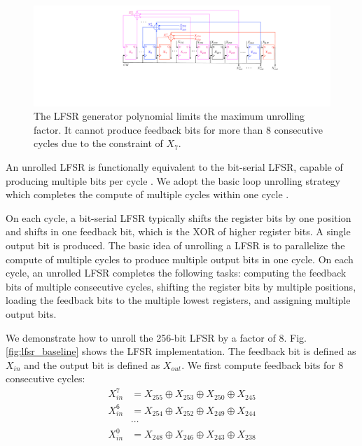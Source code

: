 \begin{figure}[t!]
\centering
\includegraphics[width = 1.0\linewidth]{./figs/lfsr_unroll_limit_compressed}
\caption{The LFSR generator polynomial limits the maximum unrolling factor. It cannot produce feedback bits for more than $8$ consecutive cycles due to the constraint of $X_{7}$.}
\label{fig:lfsr_unrol_limit}
\end{figure}

An unrolled LFSR is functionally equivalent to the bit-serial LFSR, capable of producing multiple bits per cycle %
\cite{cycle_efficient_lfsr, unrolled_lfsr_ref_2}. We adopt the basic loop unrolling strategy which completes the compute of multiple cycles within one cycle \cite{cycle_efficient_lfsr}.%

On each cycle, a bit-serial LFSR typically shifts the register bits by one position and shifts in one feedback bit, which is the XOR of higher register bits. A single output bit is produced. The basic idea of unrolling a LFSR is to parallelize the compute of multiple cycles to produce multiple output bits in one cycle. On each cycle, an unrolled LFSR completes the following tasks: computing the feedback bits of multiple consecutive cycles, shifting the register bits by multiple positions, loading the feedback bits to the multiple lowest registers, and assigning multiple output bits. 

We demonstrate how to unroll the 256-bit LFSR by a factor of 8. Fig. \ref{fig:lfsr_baseline} shows the LFSR implementation. The feedback bit is defined as $X_{in}$ and the output bit is defined as $X_{out}$. %
We first compute feedback bits for 8 consecutive cycles:
\begin{align*}
    X_{in} ^ 7 &=  X_{255} \oplus X_{253} \oplus X_{250} \oplus X_{245} \\
    X_{in} ^ 6 &=  X_{254} \oplus X_{252} \oplus X_{249} \oplus X_{244} \\
    &\cdots \\
    X_{in} ^ 0 &= X_{248} \oplus X_{246} \oplus X_{243} \oplus X_{238}
\end{align*}

